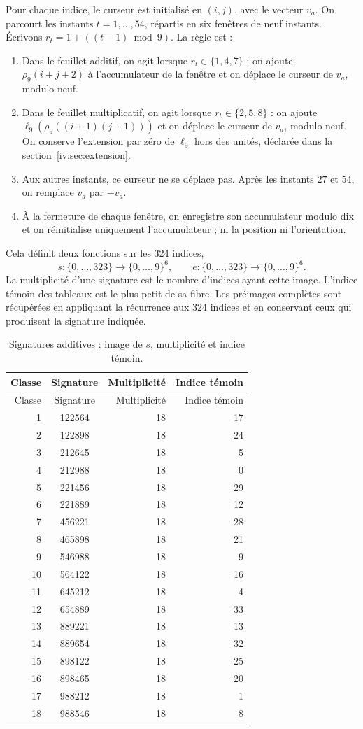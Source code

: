 Pour chaque indice, le curseur est initialisé en \((i,j)\), avec le vecteur \(v_a\).
On parcourt les instants \(t=1,\ldots,54\), répartis en six fenêtres
de neuf instants. Écrivons \(r_t=1+((t-1)\bmod9)\). La règle est :
\begin{enumerate}
\item Dans le feuillet additif, on agit lorsque \(r_t\in\{1,4,7\}\) :
on ajoute \(\rho_9(i+j+2)\) à l’accumulateur de la fenêtre et on
déplace le curseur de \(v_a\), modulo neuf.
\item Dans le feuillet multiplicatif, on agit lorsque \(r_t\in\{2,5,8\}\) :
on ajoute \(\ell_9(\rho_9((i+1)(j+1)))\) et on déplace le curseur
de \(v_a\), modulo neuf. On conserve l’extension par zéro de
\(\ell_9\) hors des unités, déclarée dans la section~\ref{iv:sec:extension}.
\item Aux autres instants, ce curseur ne se déplace pas. Après
les instants \(27\) et \(54\), on remplace \(v_a\) par \(-v_a\).
\item À la fermeture de chaque fenêtre, on enregistre son accumulateur modulo dix
et on réinitialise uniquement l’accumulateur ; ni la position ni l’orientation.
\end{enumerate}
Cela définit deux fonctions sur les 324 indices,
\[
 s:\{0,\ldots,323\}\longrightarrow\{0,\ldots,9\}^6,\qquad
 e:\{0,\ldots,323\}\longrightarrow\{0,\ldots,9\}^6.
\]
La multiplicité d’une signature est le nombre d’indices ayant cette image.
L’indice témoin des tableaux est le plus petit de sa fibre.
Les préimages complètes sont récupérées en appliquant la récurrence aux
324 indices et en conservant ceux qui produisent la signature indiquée.

\begin{longtable}{rcrr}
\caption{Signatures additives : image de \(s\), multiplicité et indice témoin.}
\label{iv:iv:tabla-firmas-aditivas}\\
\toprule
Classe & Signature & Multiplicité & Indice témoin\\
\midrule
\endfirsthead
\toprule
Classe & Signature & Multiplicité & Indice témoin\\
\midrule
\endhead
1&122564&18&17\\
2&122898&18&24\\
3&212645&18&5\\
4&212988&18&0\\
5&221456&18&29\\
6&221889&18&12\\
7&456221&18&28\\
8&465898&18&21\\
9&546988&18&9\\
10&564122&18&16\\
11&645212&18&4\\
12&654889&18&33\\
13&889221&18&13\\
14&889654&18&32\\
15&898122&18&25\\
16&898465&18&20\\
17&988212&18&1\\
18&988546&18&8\\
\bottomrule
\end{longtable}

